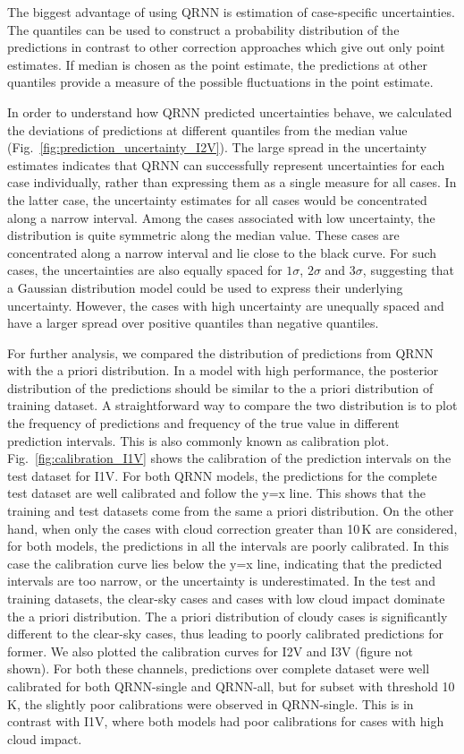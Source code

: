 \documentclass[amt, manuscript]{copernicus}
\begin{document}
The biggest advantage of using QRNN is estimation of case-specific uncertainties. The quantiles can be used to construct a probability distribution of the predictions in contrast to other correction approaches which give out only point estimates. If median is chosen as the point estimate, the predictions at other quantiles provide a measure of the possible fluctuations in the point estimate. 

In order to understand how QRNN predicted uncertainties behave, we calculated the deviations of predictions at different quantiles from the median value (Fig.~\ref{fig:prediction_uncertainty_I2V}). The large spread in the uncertainty estimates indicates that QRNN can successfully represent uncertainties for each case individually, rather than expressing them as a single measure for all cases. In the latter case, the uncertainty estimates for all cases would be concentrated along a narrow interval. Among the cases associated with low uncertainty, the distribution is quite symmetric along the median value. These cases are concentrated along a narrow interval and lie close to the black curve. For such cases, the uncertainties are also equally spaced for $1\sigma$, $2\sigma$ and $3\sigma$, suggesting that a Gaussian distribution model could be used to express their underlying uncertainty. However, the cases with high uncertainty are unequally spaced and have a larger spread over positive quantiles than negative quantiles.  

For further analysis, we compared the distribution of predictions from QRNN with the a priori distribution. In a model with high performance, the posterior distribution of the predictions should be similar to the a priori distribution of training dataset. A straightforward way to compare the two distribution is to plot the frequency of predictions and frequency of the true value in different prediction intervals. This is also commonly known as calibration plot. Fig.~\ref{fig:calibration_I1V} shows the calibration of the prediction intervals on the test dataset for I1V. For both QRNN models, the predictions for the complete test dataset are well calibrated and follow the y=x line. This shows that the training and test datasets come from the same a priori distribution. On the other hand, when only the cases with  cloud correction greater than 10\,K are considered, for both models, the predictions in all the intervals are poorly calibrated. In this case the calibration curve lies below the y=x line, indicating that the predicted intervals are too narrow, or the uncertainty is underestimated. In the test and training datasets, the clear-sky cases and cases with low cloud impact dominate the a priori distribution. The a priori distribution of cloudy cases is significantly different to the clear-sky cases, thus leading to poorly calibrated predictions for former. We also plotted the calibration curves for I2V and I3V (figure not shown). For both these channels, predictions over complete dataset were well calibrated for both QRNN-single and QRNN-all, but for subset with threshold 10\,K, the slightly poor calibrations were observed in QRNN-single. This is in contrast with I1V, where both models had poor calibrations for cases with high cloud impact. 
\end{document}
